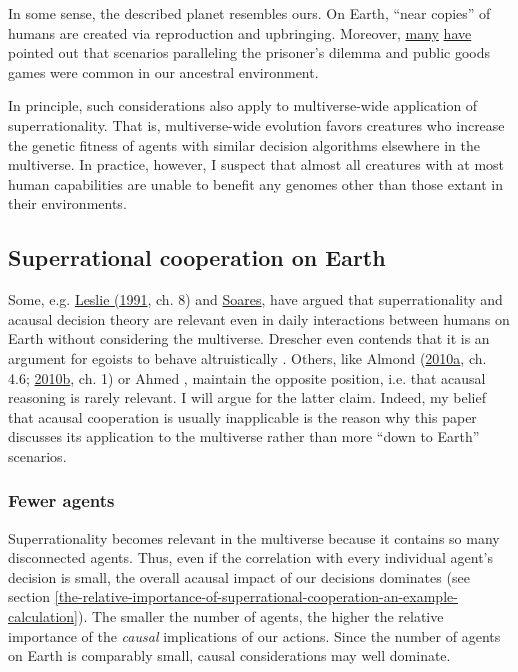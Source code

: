 In some sense, the described planet resembles ours. On Earth, ``near
copies'' of humans are created via reproduction and upbringing.
Moreover,
\href{http://mindingourway.com/newcomblike-problems-are-the-norm/}{many}
\href{https://en.wikipedia.org/wiki/Prisoner\%27s_dilemma\#Real-life_examples}{have}
pointed out that scenarios paralleling the prisoner's dilemma and public
goods games were common in our ancestral environment.

In principle, such considerations also apply to multiverse-wide
application of superrationality. That is, multiverse-wide evolution
favors creatures who increase the genetic fitness of agents with similar
decision algorithms elsewhere in the multiverse. In practice, however, I
suspect that almost all creatures with at most human capabilities are
unable to benefit any genomes other than those extant in their
environments.

\hypertarget{superrational-cooperation-on-earth}{\subsection{Superrational
cooperation on Earth}\label{superrational-cooperation-on-earth}}

Some, e.g.
\href{http://www.jstor.org/stable/2254984?seq=1\#page_scan_tab_contents}{Leslie
(1991}, ch. 8) and
\href{http://mindingourway.com/newcomblike-problems-are-the-norm/}{Soares}, have argued that
superrationality and acausal decision theory
are relevant even in daily interactions between humans on Earth without
considering the multiverse. Drescher even contends that it is an
argument for egoists to behave altruistically \citeyear{Drescher2006-ky}. Others, like Almond
(\href{https://casparoesterheld.files.wordpress.com/2016/12/almond_edt_1.pdf}{2010a},
ch. 4.6;
\href{https://web.archive.org/web/20120310010225/http://www.paul-almond.com/Correlation2.pdf}{2010b},
ch. 1) or Ahmed \citeyear{Ahmed2014-ec}, maintain the opposite
position, i.e. that acausal reasoning is rarely relevant. I will argue
for the latter claim. Indeed, my belief that acausal cooperation is
usually inapplicable is the reason why this paper discusses its
application to the multiverse rather than more ``down to Earth''
scenarios.

\subsubsection{Fewer agents}\label{fewer-agents}

Superrationality becomes relevant in the multiverse because it contains
so many disconnected agents. Thus, even if the correlation with every
individual agent's decision is small, the overall acausal impact of our
decisions dominates (see section
\ref{the-relative-importance-of-superrational-cooperation-an-example-calculation}). The smaller the number of agents, the higher the
relative importance of the \emph{causal} implications of our actions.
Since the number of agents on Earth is comparably small, causal
considerations may well dominate.

